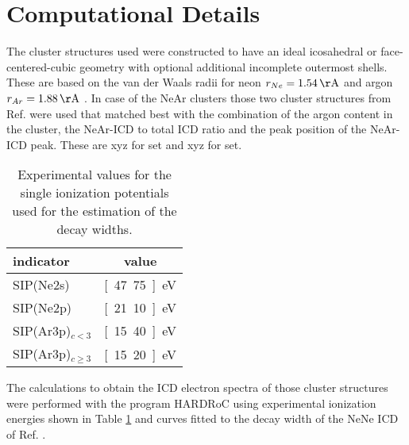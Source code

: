 \section{Computational Details}
The cluster structures used were constructed to have an ideal icosahedral or
face-centered-cubic geometry with optional additional incomplete outermost
shells. These are based on the van der Waals radii for neon
$r_{Ne}=\unit[1.54]{\AA}$ \cite{}
and argon $r_{Ar}=\unit[1.88]{\AA}$ \cite{}. In case of the NeAr clusters those
two cluster structures from Ref. \cite{Fasshauer14_1} were used that matched best
with the combination of the argon content in the cluster, the NeAr-ICD to total
ICD ratio and the peak position of the NeAr-ICD peak. These are xyz
for set 
and xyz for set.


\begin{table}[h]
 \caption{Experimental values for the single ionization potentials
          \cite{Fasshauer14_1}
          used for the estimation of the decay widths.}
 \label{table:exp_input}
 \centering
 \begin{tabular}{lc}
  \toprule
  indicator            &  value \\
  \midrule
  SIP(Ne2s)            &  \unit[47.75]{eV} \\
  SIP(Ne2p)            &  \unit[21.10]{eV} \\
  SIP(Ar3p)$_{c<3}$    &  \unit[15.40]{eV} \\
  SIP(Ar3p)$_{c\ge 3}$ &  \unit[15.20]{eV} \\
  \bottomrule
 \end{tabular}
\end{table}


The calculations to obtain the ICD electron spectra of those cluster
structures were performed with
the program HARDRoC \cite{HARDRoC} using experimental ionization energies shown
in Table \ref{table:exp_input} and curves fitted to the decay width of the
NeNe ICD of Ref. \cite{}.
